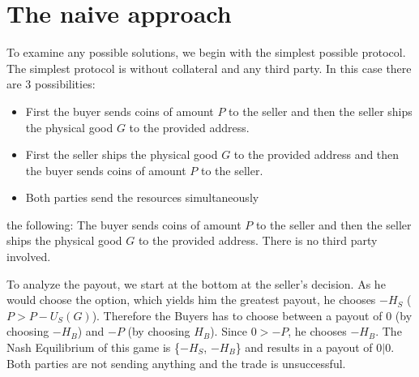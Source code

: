 \documentclass{cacthesis}
\begin{document}
\section{The naive approach}
To examine any possible solutions, we begin with the simplest possible protocol.\newline
The simplest protocol is without collateral and any third party. In this case there are 3 possibilities:
\begin{itemize}
	\item First the buyer sends coins of amount $P$ to the seller and then the seller ships the physical good $G$ to the provided address. 
	\item First the seller ships the physical good $G$ to the provided address and then the buyer sends coins of amount $P$ to the seller. 
	\item Both parties send the resources simultaneously
\end{itemize}
 the following: The buyer sends coins of amount $P$ to the seller and then the seller ships the physical good $G$ to the provided address. There is no third party involved. 

\newline
To analyze the payout, we start at the bottom at the seller's decision. As he would choose the option, which yields him the greatest payout, he chooses $-H_S$ ($P > P - U_S(G)$).\newline
Therefore the Buyers has to choose between a payout of 0 (by choosing $-H_B$) and $-P$ (by choosing $H_B$). Since $0 > -P$, he chooses $-H_B$.\newline
The Nash Equilibrium of this game is \{$-H_S$, $-H_B$\} and results in a payout of $0|0$. Both parties are not sending anything and the trade is unsuccessful.
\end{document}
